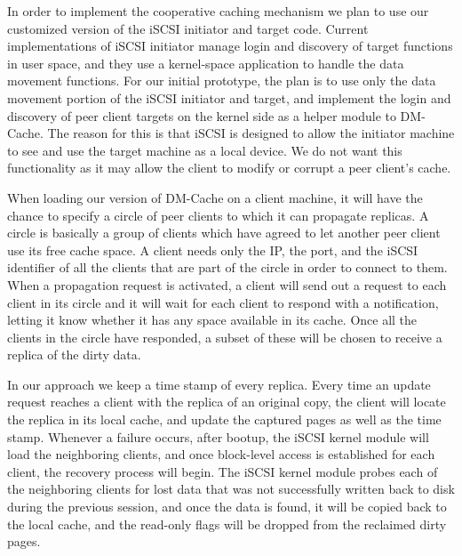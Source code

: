 In order to implement the cooperative caching mechanism we plan to
use our customized version of the iSCSI initiator and target code.
Current implementations of iSCSI initiator manage login and discovery
of target functions in user space, and they use a kernel-space application
to handle the data movement functions. For our initial prototype, the plan
is to use only the data movement portion of the iSCSI initiator and target,
and implement the login and discovery of peer client targets on the kernel
side as a helper module to DM-Cache. The reason for this is that iSCSI is
designed to allow the initiator machine to see and use the target machine
as a local device. We do not want this functionality as it may allow the
client to modify or corrupt a peer client's cache.

When loading our version of DM-Cache on a client machine, it will have the
chance to specify a circle of peer clients to which it can propagate replicas.
A circle is basically a group of clients which have agreed to let another peer
client use its free cache space. A client needs only the IP, the port, and the
iSCSI identifier of all the clients that are part of the circle in order to
connect to them. When a propagation request is activated, a client will send
out a request to each client in its circle and it will wait for each client to
respond with a notification, letting it know whether it has any space available
in its cache. Once all the clients in the circle have responded, a subset of
these will be chosen to receive a replica of the dirty data.

In our approach we keep a time stamp of every replica. Every time an update request
reaches a client with the replica of an original copy, the client will locate the
replica in its local cache, and update the captured pages as well as the time stamp.
Whenever a failure occurs, after bootup, the iSCSI kernel module will load the neighboring
clients, and once block-level access is established for each client, the recovery process
will begin. The iSCSI kernel module probes each of the neighboring clients for lost data
that was not successfully written back to disk during the previous session, and once the
data is found, it will be copied back to the local cache, and the read-only flags will be
dropped from the reclaimed dirty pages.

\label{approach}
